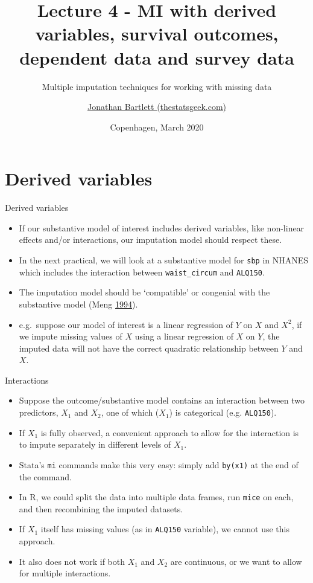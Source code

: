 \documentclass[ignorenonframetext,]{beamer}
\title{Lecture 4 - MI with derived variables, survival outcomes, dependent data
and survey data}
\subtitle{Multiple imputation techniques for working with missing data}
\author{\href{https://thestatsgeek.com}{Jonathan Bartlett (thestatsgeek.com)}}
\date{Copenhagen, March 2020}
\providecommand{\tightlist}{%
  \setlength{\itemsep}{0pt}\setlength{\parskip}{0pt}}
\begin{document}
\frame{\titlepage}

\begin{frame}
\tableofcontents[hideallsubsections]
\end{frame}
\hypertarget{derived-variables}{%
\section{Derived variables}\label{derived-variables}}

\begin{frame}[fragile]{Derived variables}
\protect\hypertarget{derived-variables-1}{}

\begin{itemize}
\tightlist
\item
  If our substantive model of interest includes derived variables, like
  non-linear effects and/or interactions, our imputation model should
  respect these.
\item
  In the next practical, we will look at a substantive model for
  \texttt{sbp} in NHANES which includes the interaction between
  \texttt{waist\_circum} and \texttt{ALQ150}.
\item
  The imputation model should be `compatible' or congenial with the
  substantive model (Meng \protect\hyperlink{ref-Meng:1994}{1994}).
\item
  e.g.~suppose our model of interest is a linear regression of \(Y\) on
  \(X\) and \(X^2\), if we impute missing values of \(X\) using a linear
  regression of \(X\) on \(Y\), the imputed data will not have the
  correct quadratic relationship between \(Y\) and \(X\).
\end{itemize}

\end{frame}

\begin{frame}[fragile]{Interactions}
\protect\hypertarget{interactions}{}

\begin{itemize}
\tightlist
\item
  Suppose the outcome/substantive model contains an interaction between
  two predictors, \(X_{1}\) and \(X_{2}\), one of which (\(X_{1}\)) is
  categorical (e.g. \texttt{ALQ150}).
\item
  If \(X_{1}\) is fully observed, a convenient approach to allow for the
  interaction is to impute separately in different levels of \(X_{1}\).
\item
  Stata's \texttt{mi} commands make this very easy: simply add
  \texttt{by(x1)} at the end of the command.
\item
  In R, we could split the data into multiple data frames, run
  \texttt{mice} on each, and then recombining the imputed datasets.
\item
  If \(X_{1}\) itself has missing values (as in \texttt{ALQ150}
  variable), we cannot use this approach.
\item
  It also does not work if both \(X_{1}\) and \(X_{2}\) are continuous,
  or we want to allow for multiple interactions.
\end{itemize}

\end{frame}
\end{document}

